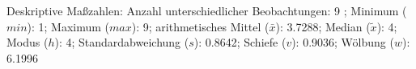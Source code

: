 				\label{tableValues:bsch16b}
				\vspace*{-\baselineskip}
                    \begin{noten}
                	    \note{} Deskriptive Maßzahlen:
                	    Anzahl unterschiedlicher Beobachtungen: 9%
                	    ; 
                	      Minimum ($min$): 1; 
                	      Maximum ($max$): 9; 
                	      arithmetisches Mittel ($\bar{x}$): \num[round-mode=places,round-precision=2]{3.7288}; 
                	      Median ($\tilde{x}$): 4; 
                	      Modus ($h$): 4; 
                	      Standardabweichung ($s$): \num[round-mode=places,round-precision=2]{0.8642}; 
                	      Schiefe ($v$): \num[round-mode=places,round-precision=2]{0.9036}; 
                	      Wölbung ($w$): \num[round-mode=places,round-precision=2]{6.1996}
                     \end{noten}

